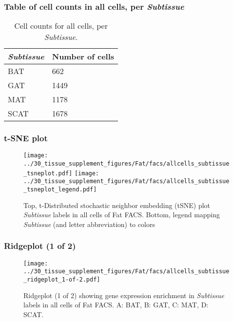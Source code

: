 \subsubsection{Table of cell counts in all cells, per \emph{Subtissue}}\begin{table}[h]
\centering
\label{my-label}
\begin{tabular}{@{}ll@{}}
\toprule

\emph{Subtissue}& Number of cells \\ \midrule
BAT & 662 \\

GAT & 1449 \\

MAT & 1178 \\

SCAT & 1678 \\
\bottomrule
\end{tabular}
\caption{Cell counts for all cells, per \emph{Subtissue}.}
\end{table}

\clearpage
\subsubsection{t-SNE plot}
\begin{figure}[h]
\centering
\texttt{[image: ../30\_tissue\_supplement\_figures/Fat/facs/allcells\_subtissue\_tsneplot.pdf]}
\texttt{[image: ../30\_tissue\_supplement\_figures/Fat/facs/allcells\_subtissue\_tsneplot\_legend.pdf]}
\caption{Top, t-Distributed stochastic neighbor embedding (tSNE) plot  \emph{Subtissue} labels in all cells of Fat FACS. Bottom, legend mapping \emph{Subtissue} (and letter abbreviation) to colors}
\end{figure}


\clearpage

\subsubsection{Ridgeplot (1 of 2)}
\begin{figure}[h]
\centering
\texttt{[image: ../30\_tissue\_supplement\_figures/Fat/facs/allcells\_subtissue\_ridgeplot\_1-of-2.pdf]}

\caption{ Ridgeplot (1 of 2)  showing gene expression enrichment in \emph{Subtissue} labels in all cells of Fat FACS. A: BAT, B: GAT, C: MAT, D: SCAT.}
\end{figure}


\clearpage

